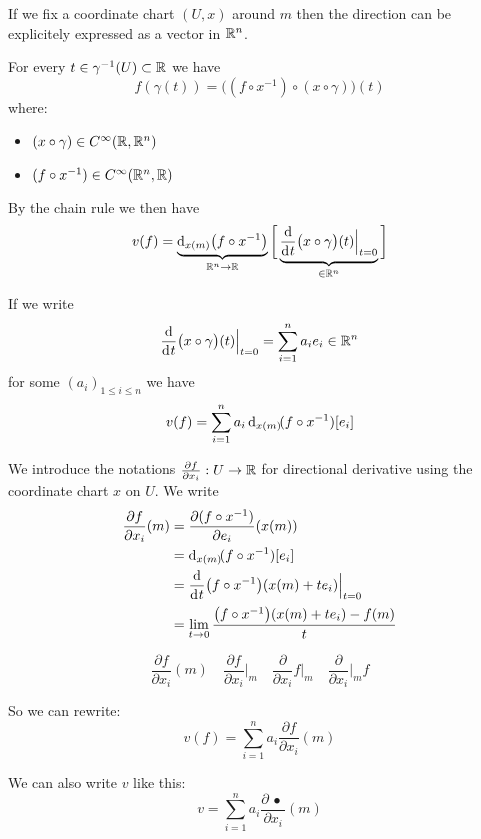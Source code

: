 

		If we fix a coordinate chart $(U, x)$ around $m$ then the direction can be explicitely expressed as a vector in $\mathbb{R}^n$.

		For every $t \in \gamma^{-1}(U) \subset \mathbb{R}$ we have
		$$
			f(\gamma(t)) = \big( (f \circ x^{-1}) \circ (x \circ \gamma) \big)(t)
		$$
		where:
		\begin{itemize}
			\item $(x \circ \gamma) \in C^\infty(\mathbb{R}, \mathbb{R}^n)$
			\item $(f \circ x^{-1}) \in C^\infty(\mathbb{R}^n, \mathbb{R})$
		\end{itemize}
		By the chain rule we then have
		$$
			v(f) = \underbrace{\di[x(m)] \big( f \circ x^{-1} \big)}_{\R^n \to \R} \bigg[ \underbrace{\frac{\d}{\di{t}} \big( x \circ \gamma \big)(t) \Big|_{t=0}}_{\in \R^n} \bigg]
		$$

		If we write
		$$
			\frac{\d}{\di{t}} \big( x \circ \gamma \big)(t) \Big|_{t=0} = \sum_{i=1}^n a_i e_i \in \R^n
		$$
		for some $(a_i)_{1 \leq i \leq n}$ we have
		$$
			v(f) = \sum_{i=1}^n a_i \di[x(m)](f \circ x^{-1})[e_i]
		$$

		We introduce the notations $\frac{\partial{f}}{\partial{x_i}}: U \to \mathbb{R}$ for directional derivative using the coordinate chart $x$ on $U$. We write
		\begin{align*}
			\frac{\partial{f}}{\partial{x_i}}(m) &= \frac{\partial{(f \circ x^{-1})}}{\partial{e_i}}(x(m)) \\
			                                     &= \di[x(m)](f \circ x^{-1})[e_i] \\
			                                     &= \frac{\d}{\di{t}} \big( f \circ x^{-1} \big)(x(m) + t e_i) \Big|_{t=0} \\
			                                     &= \lim_{t \to 0} \frac{\big( f \circ x^{-1} \big)(x(m) + t e_i) - f(m)}{t}
		\end{align*}

		$$
			\frac{\partial{f}}{\partial{x_i}}(m) \quad \frac{\partial{f}}{\partial{x_i}}\Big|_m \quad \frac{\partial}{\partial{x_i}} f \Big|_m \quad \frac{\partial}{\partial{x_i}} \Big|_m f
		$$

		So we can rewrite:
		$$
			v(f) = \sum_{i=1}^n a_i \frac{\partial f}{\partial{x_i}}(m)
		$$

		We can also write $v$ like this:
		$$
			v = \sum_{i=1}^n a_i \frac{\partial \,\bullet\,}{\partial{x_i}}(m)
		$$

